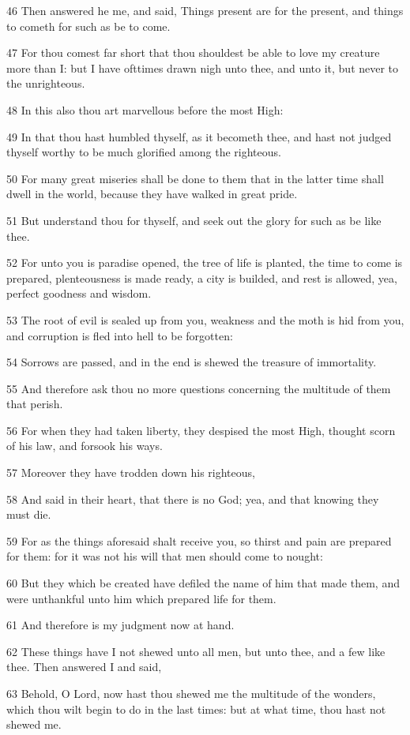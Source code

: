 \par 46 Then answered he me, and said, Things present are for the present, and things to cometh for such as be to come.
\par 47 For thou comest far short that thou shouldest be able to love my creature more than I: but I have ofttimes drawn nigh unto thee, and unto it, but never to the unrighteous.
\par 48 In this also thou art marvellous before the most High:
\par 49 In that thou hast humbled thyself, as it becometh thee, and hast not judged thyself worthy to be much glorified among the righteous.
\par 50 For many great miseries shall be done to them that in the latter time shall dwell in the world, because they have walked in great pride.
\par 51 But understand thou for thyself, and seek out the glory for such as be like thee.
\par 52 For unto you is paradise opened, the tree of life is planted, the time to come is prepared, plenteousness is made ready, a city is builded, and rest is allowed, yea, perfect goodness and wisdom.
\par 53 The root of evil is sealed up from you, weakness and the moth is hid from you, and corruption is fled into hell to be forgotten:
\par 54 Sorrows are passed, and in the end is shewed the treasure of immortality.
\par 55 And therefore ask thou no more questions concerning the multitude of them that perish.
\par 56 For when they had taken liberty, they despised the most High, thought scorn of his law, and forsook his ways.
\par 57 Moreover they have trodden down his righteous,
\par 58 And said in their heart, that there is no God; yea, and that knowing they must die.
\par 59 For as the things aforesaid shalt receive you, so thirst and pain are prepared for them: for it was not his will that men should come to nought:
\par 60 But they which be created have defiled the name of him that made them, and were unthankful unto him which prepared life for them.
\par 61 And therefore is my judgment now at hand.
\par 62 These things have I not shewed unto all men, but unto thee, and a few like thee. Then answered I and said,
\par 63 Behold, O Lord, now hast thou shewed me the multitude of the wonders, which thou wilt begin to do in the last times: but at what time, thou hast not shewed me.

